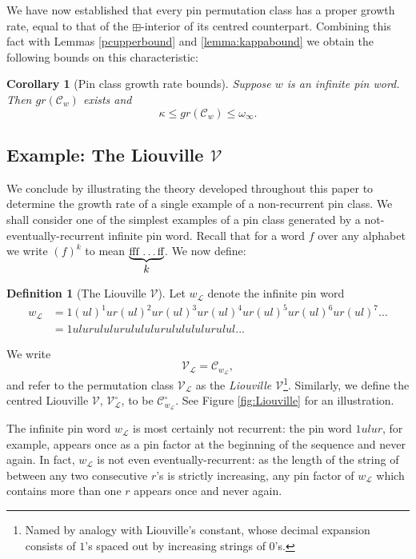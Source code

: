 \documentclass[11pt,a4paper]{article}
\newtheorem{cor}[thm]{Corollary}
\theoremstyle{definition}
\newtheorem{defn}[thm]{Definition}
\begin{document}
We have now established that every pin permutation class has a proper growth rate, equal to that of the $\boxplus$-interior of its centred counterpart. Combining this fact with Lemmas \ref{pcupperbound} and \ref{lemma:kappabound} we obtain the following bounds on this characteristic:

\begin{cor}[Pin class growth rate bounds] \label{pcgrbounds}
Suppose $w$ is an infinite pin word. Then $gr(\mathcal{C}_{w})$ exists and
\[
\kappa \leq gr(\mathcal{C}_{w}) \leq \omega_{\infty}.
\]
\end{cor}

\subsection{Example: The Liouville $\mathcal{V}$} \label{sec:4.4}

We conclude by illustrating the theory developed throughout this paper to determine the growth rate of a single example of a non-recurrent pin class. We shall consider one of the simplest examples of a pin class generated by a not-eventually-recurrent infinite pin word. Recall that for a word $f$ over any alphabet we write $(f)^{k}$ to mean $\underbrace{\mbox{fff \dots ff}}_{\mbox{{\small $k$}}}$. We now define:

\begin{defn}[The Liouville $\mathcal{V}$]
Let $w_{\mathcal{L}}$ denote the infinite pin word
\[
\begin{split}
w_{\mathcal{L}} & = 1(ul)^{1}ur(ul)^{2}ur(ul)^{3}ur(ul)^{4}ur(ul)^{5}ur(ul)^{6}ur(ul)^{7} \dots \\
 & = 1ulurululurulululurululululurulul \dots
\end{split}
\]

We write
\[
\mathcal{V}_{\mathcal{L}} = \mathcal{C}_{w_{\mathcal{L}}},
\]
and refer to the permutation class $\mathcal{V}_{\mathcal{L}}$ as the \emph{Liouville $\mathcal{V}$}\footnote{Named by analogy with Liouville's constant, whose decimal expansion consists of $1$'s spaced out by increasing strings of $0$'s.}. Similarly, we define the centred Liouville $\mathcal{V}$, $\mathcal{V}^{\circ}_{\mathcal{L}}$, to be $\mathcal{C}^{\circ}_{w_{\mathcal{L}}}$. See Figure \ref{fig:Liouville} for an illustration.
\end{defn}

The infinite pin word $w_{\mathcal{L}}$ is most certainly not recurrent: the pin word $1ulur$, for example, appears once as a pin factor at the beginning of the sequence and never again. In fact, $w_{\mathcal{L}}$ is not even eventually-recurrent: as the length of the string of between any two consecutive $r$'s is strictly increasing, any pin factor of $w_{\mathcal{L}}$ which contains more than one $r$ appears once and never again.
\end{document}
